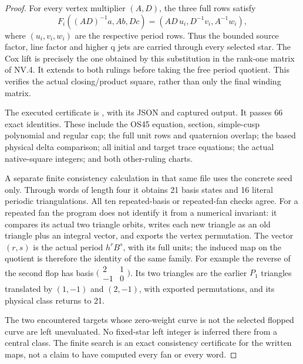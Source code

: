 \begin{proof}
For every vertex multiplier \((A,D)\), the three full rows satisfy
\[
 F_i((AD)^{-1}a,Ab,Dc)
      =(AD\,u_i,D^{-1}v_i,A^{-1}w_i),
\tag{NV.22}
\]
where \((u_i,v_i,w_i)\) are the respective period rows. Thus the
bounded source factor, line factor and higher q jets are carried
through every selected star. The Cox lift is precisely the one
obtained by this substitution in the rank-one matrix of NV.4.
It extends to both rulings before taking the free period quotient.
This verifies the actual closing/product square, rather than only
the final winding matrix.

The executed certificate is , with
its JSON and captured output. It passes 66 exact identities. These
include the OS45 equation, section, simple-cusp polynomial and regular
cap; the full unit rows and quaternion overlap; the based physical
delta comparison; all initial and target trace equations; the actual
native-square integers; and both other-ruling charts.

A separate finite consistency calculation in that same file uses the
concrete seed only. Through words of length four it obtains 21 basis
states and 16 literal periodic triangulations. All ten repeated-basis
or repeated-fan checks agree. For a repeated fan the program does
not identify it from a numerical invariant: it compares its actual
two triangle orbits, writes each new triangle as an old triangle plus
an integral vector, and exports the vertex permutation. The vector
\((r,s)\) is the actual period \(h^rB^s\), with its full units; the
induced map on the quotient is therefore the identity of the same
family. For example the reverse of the second flop has basis
\(\bigl(\begin{smallmatrix}2&1\\-1&0\end{smallmatrix}\bigr)\).
Its two triangles are the earlier \(P_1\) triangles translated by
\((1,-1)\) and \((2,-1)\), with exported permutations, and its
physical class returns to 21.

The two encountered targets whose zero-weight curve is not the
selected flopped curve are left unevaluated. No fixed-star left
integer is inferred there from a central class. The finite search
is an exact consistency certificate for the written maps, not a
claim to have computed every fan or every word.

\end{proof}
